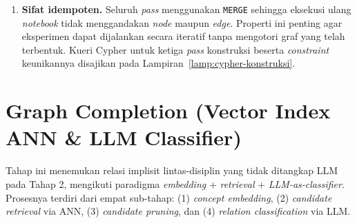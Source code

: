 \documentclass[main]{subfiles}
\begin{document}
\begin{enumerate}
  \item \textbf{Sifat idempoten.} Seluruh \textit{pass} menggunakan
  \texttt{MERGE} sehingga eksekusi ulang \textit{notebook} tidak menggandakan
  \textit{node} maupun \textit{edge}. Properti ini penting agar eksperimen dapat
  dijalankan secara iteratif tanpa mengotori graf yang telah terbentuk. Kueri
  Cypher untuk ketiga \textit{pass} konstruksi beserta \textit{constraint}
  keunikannya disajikan pada Lampiran~\ref{lamp:cypher-konstruksi}.
\end{enumerate}

\section{Graph Completion (Vector Index ANN \& LLM Classifier)}\label{sec:graph-completion}

Tahap ini menemukan relasi implisit lintas-disiplin yang tidak ditangkap LLM
pada Tahap 2, mengikuti paradigma \textit{embedding} + \textit{retrieval} + \textit{LLM-as-classifier}.
Prosesnya terdiri dari empat sub-tahap: (1) \textit{concept embedding},
(2) \textit{candidate retrieval} via ANN, (3) \textit{candidate pruning},
dan (4) \textit{relation classification} via LLM.
\end{document}
